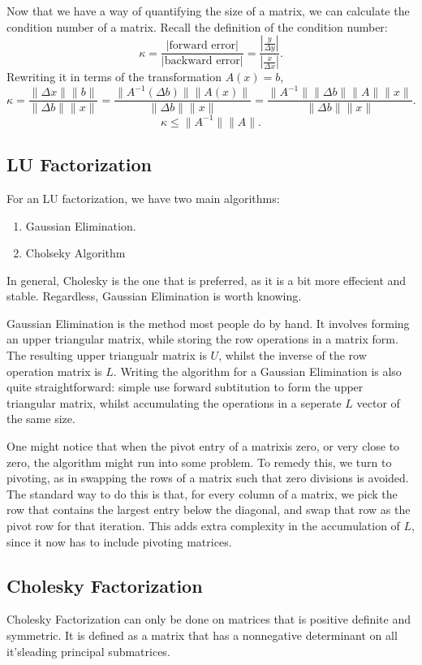 \documentclass[5pt, a4paper]{article}
\begin{document}
Now that we have a way of quantifying the size of a matrix, we can calculate the
condition number of a matrix. Recall the definition of the condition number: \[
\kappa = \frac{|\text{forward error}|}{|\text{backward error}|} = 
\frac{\left|\frac{y}{\Delta y}\right|}{\left|\frac{x}{\Delta x}\right|}
.\] 
Rewriting it in terms of the transformation $A(x) = b$, \[
\kappa =  \frac{\|\Delta x\| \|b\|}{\|\Delta b\| \|x\|}
= \frac{\|A^{-1}(\Delta b)\| \|A(x)\|}{\|\Delta b\| \|x\|}
=\frac{\|A^{-1}\|\|\Delta b\| \|A\|\|x\|}{\|\Delta b\| \|x\|}
.\] 
\[
\kappa \le \|A^{-1}\|\|A\|
.\] 

\subsection*{LU Factorization}
For an LU factorization, we have two main algorithms: 
\begin{enumerate}
    \item Gaussian  Elimination.
    \item Cholseky Algorithm
\end{enumerate}
In general, Cholesky is the one that is preferred, as it is a bit more
effecient and stable. Regardless, Gaussian Elimination is worth knowing.

Gaussian Elimination is the method most people do by hand. It involves forming
an upper triangular matrix, while storing the row operations in a matrix form.
The resulting upper triangualr matrix is $U$, whilst the inverse of the row
operation matrix is $L$. Writing the algorithm for a Gaussian Elimination is
also quite straightforward: simple use forward subtitution to form the upper
triangular matrix, whilst accumulating the operations in a seperate $L$ vector
of the same size.

One might notice that when the pivot entry of a matrixis zero, or very  close to
zero, the algorithm might run into some problem. To remedy this, we turn to
pivoting, as in swapping the rows of a matrix such that zero divisions is
avoided. The standard way to do this is that, for every column of a matrix, we
pick the row that contains the largest entry below the diagonal, and swap that
row as the pivot row for that iteration. This adds extra complexity in the
accumulation of $L$, since it now has to include pivoting matrices.

\subsection*{Cholesky Factorization}
Cholesky Factorization can only be done on matrices that is positive definite
and symmetric. It is defined as a matrix that has a nonnegative determinant on
all it'sleading principal submatrices.
\end{document}
